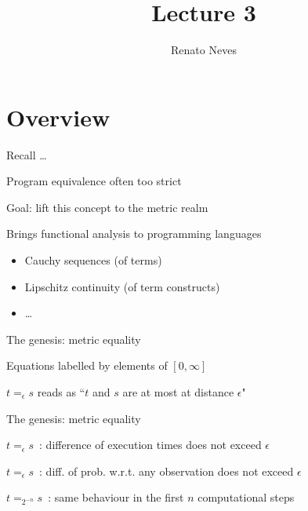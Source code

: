 \documentclass{beamer}
\author[Renato Neves]{Renato Neves}
\date{}
\begin{document}
\title{Lecture 3}

\frame[plain]{\titlepage}

\section{Overview}

\begin{frame}{Recall \dots}

        Program equivalence often too strict

        \bigskip
        \pause
        Goal: lift this concept to the \alert{metric} realm

        \bigskip
        \pause
        Brings \alert{functional analysis} to programming languages
        \begin{itemize}
                \item Cauchy sequences (of terms)
                \item Lipschitz continuity (of term constructs)
                \item \dots
        \end{itemize}

\end{frame}

\begin{frame}{The genesis: metric equality}

        Equations labelled by elements of $[0,\infty]$

        \bigskip
        $t =_\epsilon s$ reads as ``$t$ and $s$ are \alert{at most}
        at distance $\epsilon$"

\end{frame}

\begin{frame}{The genesis: metric equality}

        \begin{example}
                $t =_\epsilon s \, $ : difference of execution times 
                does not exceed $\epsilon$
        \end{example}

        \bigskip
        \pause
        \begin{example}
                $t =_\epsilon s \,$ : diff. of prob.
                w.r.t. any observation does not exceed $\epsilon$
        \end{example}

        \bigskip
        \pause
        \begin{example}
                $t =_{2^{-n}} s \,$ : same behaviour
                in the first $n$ computational steps
        \end{example}
\end{frame}
\end{document}
